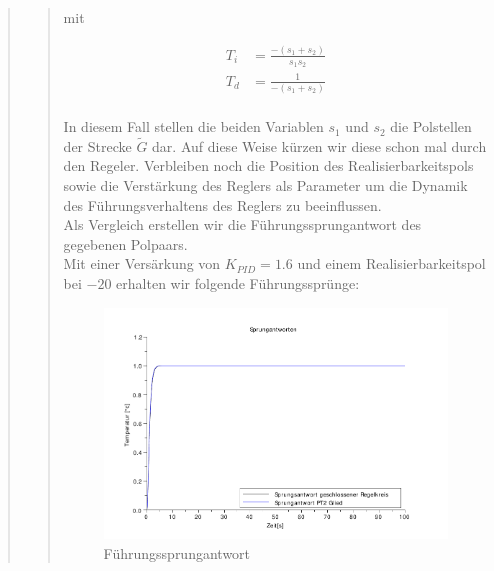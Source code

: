 \begin{quote}
\begin{quote}
        mit 
        
        \begin{equation*}
        	\begin{split}
        		T_i &= \frac{-(s_1 + s_2)}{s_1 s_2}\\
        		T_d &= \frac{1}{-(s_1 + s_2)}\\
        	\end{split}
        \end{equation*}
        
        In diesem Fall stellen die beiden Variablen $s_1$ und $s_2$ die Polstellen der Strecke $\tilde{G}$ dar. Auf
        diese Weise kürzen wir diese schon mal durch den Regeler. Verbleiben noch die Position des Realisierbarkeitspols
        sowie die Verstärkung des Reglers als Parameter um die Dynamik des Führungsverhaltens des Reglers zu
        beeinflussen.\\
        
        Als Vergleich erstellen wir die Führungssprungantwort des gegebenen Polpaars.\\
        
        Mit einer Versärkung von $K_{PID} = 1.6$ und einem Realisierbarkeitspol bei $-20$ erhalten wir folgende
        Führungssprünge:
        
        \begin{figure}[H]
        \centering
            \includegraphics[scale=0.7, trim = 0cm 0cm 0cm 0cm, clip]{./Bilder/Sprungantwort}
                \caption{Führungssprungantwort}
        \end{figure}
    
    \end{quote}
    

\end{quote}
